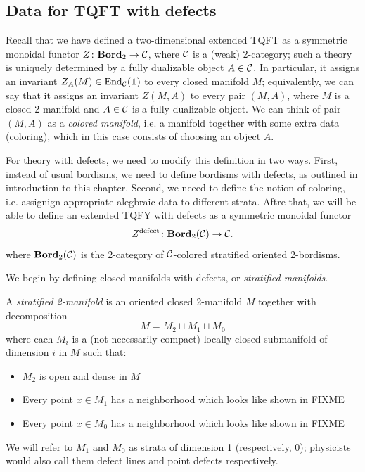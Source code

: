 \begin{defectfiguresetup}
\section{Data for TQFT with defects}\label{s:defect-data}
Recall that we have defined a two-dimensional extended TQFT as a symmetric
monoidal functor $Z\colon \mathbf{Bord}_2\to \mathcal{C}$, where $\mathcal{C}$ is a (weak)
2-category; such a theory is uniquely determined by a fully dualizable object
$A\in \mathcal{C}$. In particular, it assigns an invariant $Z_A(M)\in
\operatorname{End}_{\mathcal{C}}(\mathbf{1})$ to every closed manifold $M$; equivalently, we can say that
it assigns an invariant $Z(M,A)$ to every pair $(M, A)$, where $M$ is a closed
2-manifold and $A\in \mathcal{C}$ is a fully dualizable object. We can think of pair
$(M,A)$ as a \emph{colored manifold}, i.e. a manifold together with some extra
data (coloring), which in this case consists of choosing an object $A$.

For theory with defects, we need to modify this definition in two ways. First,
instead of usual bordisms, we need to define bordisms with defects,  as
outlined in introduction to this chapter. Second, we neeed to define the notion
of coloring, i.e. assignign appropriate alegbraic data to different strata.
Aftre that, we will be able to define an extended TQFY with defects as a
symmetric monoidal functor
$$
Z^{\mathrm{defect}}\colon \mathbf{Bord}_2(\mathcal{C})\to \mathcal{C}.
$$
where $\mathbf{Bord}_2(\mathcal{C})$ is the 2-category of $\mathcal{C}$-colored stratified oriented
2-bordisms.


We begin by defining closed manifolds
with defects, or \emph{stratified manifolds}.

\begin{definition}\label{d:stratified_manifold}
  A \emph{stratified 2-manifold} is an
  oriented closed 2-manifold $M$ together with  decomposition
  $$
    M=M_2\sqcup M_1\sqcup M_0
  $$
  where each $M_i$ is a (not necessarily compact) locally closed submanifold
  of dimension $i$ in $M$ such that:
  \begin{itemize}
    \item $M_2$ is open and dense in $M$
    \item Every point $x\in M_1$ has a neighborhood which looks like shown in
    FIXME
    \item Every point $x\in M_0$ has a neighborhood which looks like shown in
    FIXME
  \end{itemize}
\end{definition}
We will refer to $M_1$ and $M_0$ as strata of dimension 1 (respectively, 0);
physicists would also call them defect lines and point defects respectively.


\end{defectfiguresetup}
